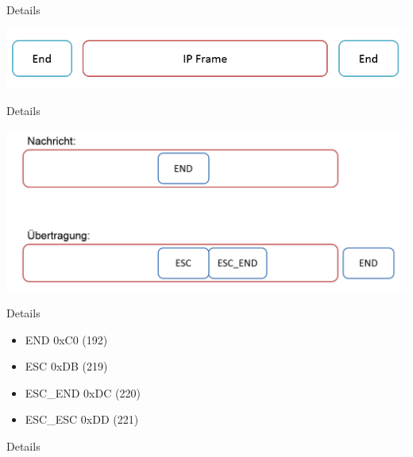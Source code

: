 \documentclass[beamer]{uibk}
\begin{document}
\begin{frame}{Details}
  \newpage
  \begin{center}
  \includegraphics[width=\textwidth,height=\textheight,keepaspectratio]{ip2.png}
  \end{center}
\end{frame}

\begin{frame}{Details}
  \newpage
  \begin{center}
  \includegraphics[width=\textwidth,height=\textheight,keepaspectratio]{escaping.png}
  \end{center}
\end{frame}

\begin{frame}{Details}
  \newpage
  \begin{center}
  \begin{itemize}
    \item END      \tabto{3cm} 0xC0 (192)
    \item ESC      \tabto{3cm} 0xDB (219)
    \item ESC\_END \tabto{3cm} 0xDC (220)
    \item ESC\_ESC \tabto{3cm} 0xDD (221)
  \end{itemize}
  \end{center}
\end{frame}

\begin{frame}{Details}
  \newpage
  \begin{center}
    
  \end{center}
\end{frame}
\end{document}
